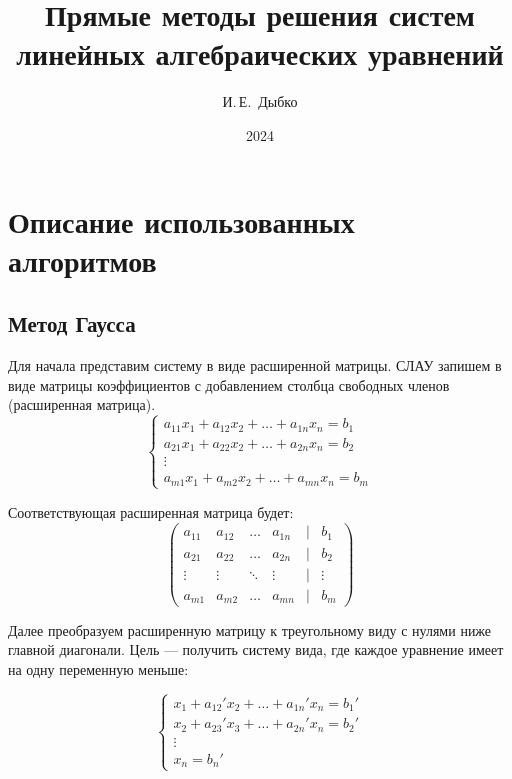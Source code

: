 \documentclass[12pt, a4paper]{article}
\title{Прямые методы решения систем
	линейных алгебраических уравнений}
\author{И.\,Е.~Дыбко}
\date{2024}
\begin{document}
	
	\maketitle
	
	\tableofcontents
	\section{Описание использованных алгоритмов}
	
	\subsection{Метод Гаусса}		
	Для начала представим систему в виде расширенной матрицы. СЛАУ запишем в виде матрицы коэффициентов с добавлением столбца свободных членов (расширенная матрица).
	\begin{equation*}
	\begin{cases}
		a_{11}x_1 + a_{12}x_2 + \dots + a_{1n}x_n = b_1 \\
		a_{21}x_1 + a_{22}x_2 + \dots + a_{2n}x_n = b_2 \\
		\vdots \\
		a_{m1}x_1 + a_{m2}x_2 + \dots + a_{mn}x_n = b_m
	\end{cases}
	\end{equation*}
	
	Соответствующая расширенная матрица будет:
	\begin{equation*}
		\begin{pmatrix}
			a_{11} & a_{12} & \dots & a_{1n} & | & b_1 \\
			a_{21} & a_{22} & \dots & a_{2n} & | & b_2 \\
			\vdots & \vdots & \ddots & \vdots & | & \vdots \\
			a_{m1} & a_{m2} & \dots & a_{mn} & | & b_m
		\end{pmatrix}
	\end{equation*}
	
	Далее преобразуем расширенную матрицу к треугольному виду с нулями ниже главной диагонали. Цель — получить систему вида, где каждое уравнение имеет на одну переменную меньше:
	
	\begin{equation*}
		\begin{cases}
			x_1 + a_{12}'x_2 + \dots + a_{1n}'x_n = b_1' \\
			x_2 + a_{23}'x_3 + \dots + a_{2n}'x_n = b_2' \\
			\vdots \\
			x_n = b_n'
		\end{cases}
	\end{equation*}
	
\end{document}
